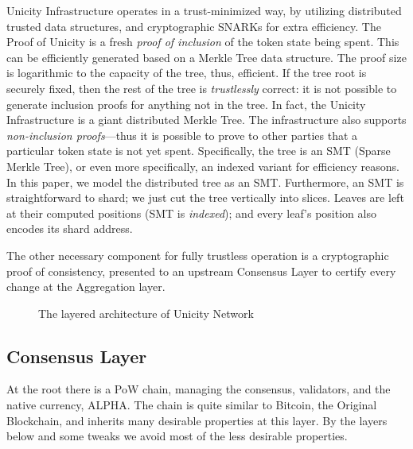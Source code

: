 \documentclass[twocolumn]{article}
\begin{document}
Unicity Infrastructure operates in a trust-minimized way, by utilizing distributed trusted data structures, and cryptographic SNARKs for extra efficiency. The Proof of Unicity is a fresh \emph{proof of inclusion} of the token state being spent. This can be efficiently generated based on a Merkle Tree data structure. The proof size is logarithmic to the capacity of the tree, thus, efficient. If the tree root is securely fixed, then the rest of the tree is \textit{trustlessly} correct: it is not possible to generate inclusion proofs for anything not in the tree. In fact, the Unicity Infrastructure is a giant distributed Merkle Tree. The infrastructure also supports \textit{non-inclusion proofs}---thus it is possible to prove to other parties that a particular token state is not yet spent. Specifically, the tree is an SMT (Sparse Merkle Tree), or even more specifically, an indexed variant for efficiency reasons. In this paper, we model the distributed tree as an SMT. Furthermore, an SMT is straightforward to shard; we just cut the tree vertically into slices. Leaves are left at their computed positions (SMT is \emph{indexed}); and every leaf's position also encodes its shard address.

The other necessary component for fully trustless operation is a cryptographic proof of consistency, presented to an upstream Consensus Layer to certify every change at the Aggregation layer.

\begin{figure}[!htbp]
    \centering
    \caption{The layered architecture of Unicity Network}\label{fig:layers}
\end{figure}


\subsection{Consensus Layer}

At the root there is a PoW chain, managing the consensus, validators, and the native currency, ALPHA. The chain is quite similar to Bitcoin, the Original Blockchain, and inherits many desirable properties at this layer. By the layers below and some tweaks we avoid most of the less desirable properties.
\end{document}
